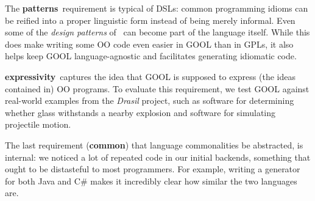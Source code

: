 \documentclass[sigplan,review,prologue,dvipsnames]{acmart}
\newcommand{\Csharp}{C\#}
\newcommand{\abbrev}[1]{\textbf{#1}}
\newcommand{\oopatterns}{\abbrev{patterns}}
\newcommand{\common}{\abbrev{common}}
\newcommand{\expressivity}{\abbrev{expressivity}}
\begin{document}
The \oopatterns~requirement is typical of DSLs: common programming idioms
can be reified into a proper linguistic form instead of being merely
informal. Even some of the \emph{design patterns} of~\cite{gamma1995design}
can become part of the language itself. While this does make writing some OO
code even easier in GOOL than in GPLs, it also helps
keep GOOL language-agnostic and facilitates generating idiomatic code.

\expressivity~captures the idea that GOOL is supposed to express
(the ideas contained in) OO programs.  To evaluate this requirement, we test 
GOOL against real-world examples from the \textit{Drasil} project, such as 
software for determining whether glass withstands a nearby explosion and 
software for simulating projectile motion.

The last requirement (\common) that language commonalities be abstracted, is
internal: we noticed a lot of repeated code in our initial
backends, something that ought to be distasteful to most programmers. For
example, writing a generator for both Java and \Csharp{} makes it incredibly
clear how similar the two languages are.
\end{document}
